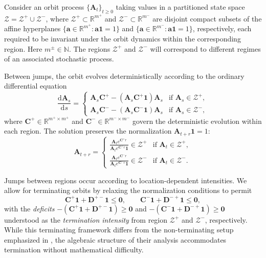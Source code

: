 \documentclass[a4paper,11pt]{article}
\numberwithin{equation}{section}
\theoremstyle{plain}
\theoremstyle{definition}
\newcommand{\1}{\mathbf{1}}
\newcommand{\dd}{\mathrm{d}}
\begin{document}
Consider an orbit process $\{\bm{A}_t\}_{t \ge 0}$ taking values in a partitioned state space $\mathcal{Z} = \mathcal{Z}^+ \cup \mathcal{Z}^-$, where $\mathcal{Z}^+ \subset \mathbb{R}^{m^+}$ and $\mathcal{Z}^- \subset \mathbb{R}^{m^-}$ are disjoint compact subsets of the affine hyperplanes $\{\bm a\in\mathbb{R}^{m^+}:\bm a\bm 1=1\}$ and $\{\bm a\in\mathbb{R}^{m^-}:\bm a\bm 1=1\}$, respectively, each required to be invariant under the orbit dynamics within the corresponding region. Here $m^\pm\in \mathbb{N}$. The regions $\mathcal{Z}^+$ and $\mathcal{Z}^-$ will correspond to different regimes of an associated stochastic process.


Between jumps, the orbit evolves deterministically according to the ordinary differential equation
\begin{equation}\label{eq:orbit_two_space}
\frac{\dd \bm{A}_s}{\dd s} = \begin{cases}
\bm{A}_s \bm{C}^+ - (\bm{A}_s \bm{C}^+ \bm{1}) \bm{A}_s & \text{if } \bm{A}_s \in \mathcal{Z}^+, \\
\bm{A}_s \bm{C}^- - (\bm{A}_s \bm{C}^- \bm{1}) \bm{A}_s & \text{if } \bm{A}_s \in \mathcal{Z}^-,
\end{cases}
\end{equation}
where $\bm{C}^+ \in \mathbb{R}^{m^+ \times m^+}$ and $\bm{C}^- \in \mathbb{R}^{m^- \times m^-}$ govern the deterministic evolution within each region. The solution preserves the normalization $\bm{A}_{t+r}\bm{1}=1$:
\begin{equation}\label{eq:orbit_solution_two_space}
\bm{A}_{t+r} = \begin{cases}
{ \frac{\bm{A}_t e^{\bm{C}^+ r}}{\bm{A}_t e^{\bm{C}^+ r} \bm{1}}} \in \mathcal{Z}^+ & \text{if } \bm{A}_t \in \mathcal{Z}^+, \\
\frac{\bm{A}_t e^{\bm{C}^- r}}{\bm{A}_t e^{\bm{C}^- r} \bm{1}} \in \mathcal{Z}^- & \text{if } \bm{A}_t \in \mathcal{Z}^-.
\end{cases}
\end{equation}

Jumps between regions occur according to location-dependent intensities. We allow for terminating orbits by relaxing the normalization conditions to permit
\begin{equation}\label{eq:normalization_two_space_terminating}
\bm{C}^+ \bm{1} + \bm{D}^{+-} \bm{1} \le \bm{0}, \qquad \bm{C}^- \bm{1} + \bm{D}^{-+} \bm{1} \le \bm{0},
\end{equation}
with the \emph{deficits} $-(\bm{C}^+ \bm{1} + \bm{D}^{+-} \bm{1})\ge \bm{0}$ and $-(\bm{C}^- \bm{1} + \bm{D}^{-+} \bm{1})\ge \bm{0}$ understood as the \emph{termination intensity} from region $\mathcal{Z}^+$ and $\mathcal{Z}^-$, respectively. 
While this terminating framework differs from the non-terminating setup emphasized in \cite{BeanNguyenNielsenPeralta2022}, the algebraic structure of their analysis accommodates termination without mathematical difficulty.
\end{document}
